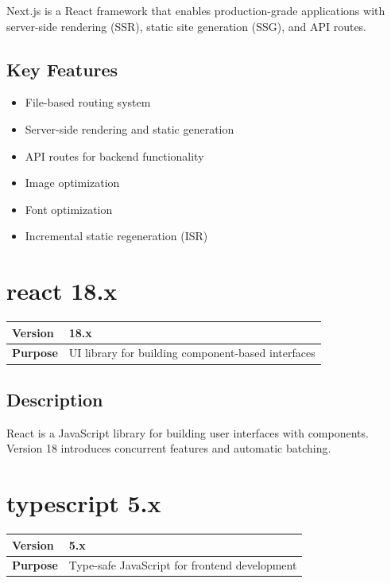 \documentclass[12pt,a4paper]{report}
\begin{document}
Next.js is a React framework that enables production-grade applications with server-side rendering (SSR), static site generation (SSG), and API routes.

\subsection{Key Features}

\begin{itemize}
    \item File-based routing system
    \item Server-side rendering and static generation
    \item API routes for backend functionality
    \item Image optimization
    \item Font optimization
    \item Incremental static regeneration (ISR)
\end{itemize}

\section{react 18.x}

\begin{tabular}{|p{4cm}|p{10cm}|}
\hline
\textbf{Version} & 18.x \\
\hline
\textbf{Purpose} & UI library for building component-based interfaces \\
\hline
\end{tabular}

\subsection{Description}

React is a JavaScript library for building user interfaces with components. Version 18 introduces concurrent features and automatic batching.

\section{typescript 5.x}

\begin{tabular}{|p{4cm}|p{10cm}|}
\hline
\textbf{Version} & 5.x \\
\hline
\textbf{Purpose} & Type-safe JavaScript for frontend development \\
\hline
\end{tabular}
\end{document}
